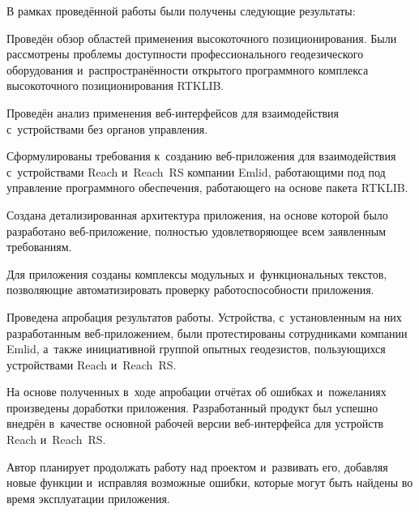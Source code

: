 
В рамках проведённой работы были получены следующие результаты:
\begin{dashitemize}
  \item Проведён обзор областей применения высокоточного позиционирования. Были рассмотрены проблемы доступности профессионального геодезического оборудования и~распространённости открытого программного комплекса высокоточного позиционирования RTKLIB.
  \item Проведён анализ применения веб-интерфейсов для взаимодействия с~устройствами без органов управления.
  \item Сформулированы требования к~созданию веб-приложения для взаимодействия с~устройствами Reach и~Reach~RS компании Emlid, работающими под под управление программного обеспечения, работающего на основе пакета RTKLIB.
  \item Создана детализированная архитектура приложения, на основе которой было разработано веб-приложение, полностью удовлетворяющее всем заявленным требованиям.
  \item Для приложения созданы комплексы модульных и~функциональных текстов, позволяющие автоматизировать проверку работоспособности приложения.
  \item Проведена апробация результатов работы. Устройства, с~установленным на них разработанным веб-приложением, были протестированы сотрудниками компании Emlid, а~также инициативной группой опытных геодезистов, пользующихся устройствами Reach и~Reach~RS.
  \item На основе полученных в~ходе апробации отчётах об ошибках и~пожеланиях произведены доработки приложения. Разработанный продукт был успешно внедрён в~качестве основной рабочей версии веб-интерфейса для устройств Reach и~Reach~RS.
\end{dashitemize}

\newpage

Автор планирует продолжать работу над проектом и~развивать его, добавляя новые функции и~исправляя возможные ошибки, которые могут быть найдены во время эксплуатации приложения.

\newpage
